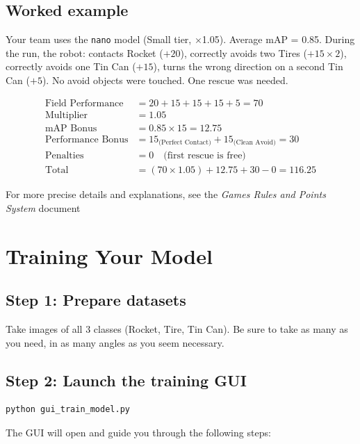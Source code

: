 \documentclass[a4]{article}
\begin{document}
\subsection*{Worked example}

Your team uses the \texttt{nano} model (Small tier, $\times$1.05). Average mAP = 0.85. During the run, the robot: contacts Rocket ($+20$), correctly avoids two Tires ($+15 \times 2$), correctly avoids one Tin Can ($+15$), turns the wrong direction on a second Tin Can ($+5$). No avoid objects were touched. One rescue was needed.

\begin{align*}
\text{Field Performance} &= 20 + 15 + 15 + 15 + 5 = 70 \\
\text{Multiplier} &= 1.05 \\
\text{mAP Bonus} &= 0.85 \times 15 = 12.75 \\
\text{Performance Bonus} &= 15_{\text{(Perfect Contact)}} + 15_{\text{(Clean Avoid)}} = 30 \\
\text{Penalties} &= 0 \quad \text{(first rescue is free)} \\
\text{Total} &= (70 \times 1.05) + 12.75 + 30 - 0 = \mathbf{116.25}
\end{align*}

For more precise details and explanations, see the \textit{Games Rules and Points System} document

\pagebreak
\section*{Training Your Model}

\subsection*{Step 1: Prepare datasets}

Take images of all 3 classes (Rocket, Tire, Tin Can). Be sure to take as many as you need, in as many angles as you seem necessary.

\subsection*{Step 2: Launch the training GUI}

\begin{verbatim}
python gui_train_model.py
\end{verbatim}

The GUI will open and guide you through the following steps:
\end{document}
